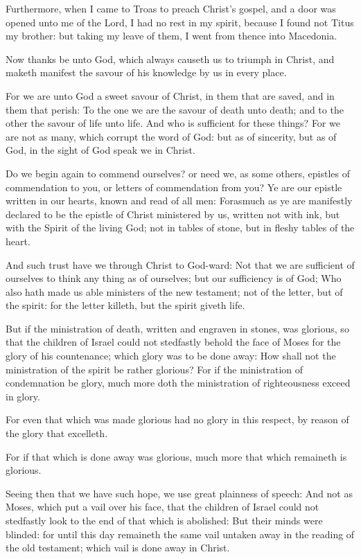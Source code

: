 \Verse Furthermore, when I came to Troas to preach Christ's gospel, and a door was opened unto me of the Lord, \Verse I had no rest in my spirit, because I found not Titus my brother: but taking my leave of them, I went from thence into Macedonia.

\Verse Now thanks be unto God, which always causeth us to triumph in Christ, and maketh manifest the savour of his knowledge by us in every place.

\Verse For we are unto God a sweet savour of Christ, in them that are saved, and in them that perish: \Verse To the one we are the savour of death unto death; and to the other the savour of life unto life. And who is sufficient for these things?  \Verse For we are not as many, which corrupt the word of God: but as of sincerity, but as of God, in the sight of God speak we in Christ.


\Chapter
\Verse Do we begin again to commend ourselves? or need we, as some others, epistles of commendation to you, or letters of commendation from you?  \Verse Ye are our epistle written in our hearts, known and read of all men: \Verse Forasmuch as ye are manifestly declared to be the epistle of Christ ministered by us, written not with ink, but with the Spirit of the living God; not in tables of stone, but in fleshy tables of the heart.

\Verse And such trust have we through Christ to God-ward: \Verse Not that we are sufficient of ourselves to think any thing as of ourselves; but our sufficiency is of God; \Verse Who also hath made us able ministers of the new testament; not of the letter, but of the spirit: for the letter killeth, but the spirit giveth life.

\Verse But if the ministration of death, written and engraven in stones, was glorious, so that the children of Israel could not stedfastly behold the face of Moses for the glory of his countenance; which glory was to be done away: \Verse How shall not the ministration of the spirit be rather glorious?  \Verse For if the ministration of condemnation be glory, much more doth the ministration of righteousness exceed in glory.

\Verse For even that which was made glorious had no glory in this respect, by reason of the glory that excelleth.

\Verse For if that which is done away was glorious, much more that which remaineth is glorious.

\Verse Seeing then that we have such hope, we use great plainness of speech: \Verse And not as Moses, which put a vail over his face, that the children of Israel could not stedfastly look to the end of that which is abolished: \Verse But their minds were blinded: for until this day remaineth the same vail untaken away in the reading of the old testament; which vail is done away in Christ.

